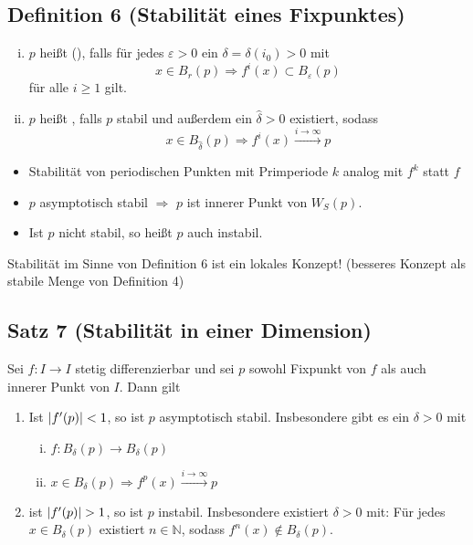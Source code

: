 \subsection{Definition 6 (Stabilität eines Fixpunktes)} %
\label{sub:definition_6}
\begin{enumerate}[(i)]
	\item $p$ heißt (), falls für jedes $\varepsilon>0$ ein $\delta=\delta(i_0)>0$ mit 
	\[
		x \in B_r(p) \Rightarrow f^i(x) \subset B_\varepsilon(p)
	\]
	für alle $i\ge 1$ gilt.
	\item $p$ heißt , falls $p$ stabil und außerdem ein $\hat{\delta}>0$ existiert, sodass 
	\[
		x \in B_{\hat{\delta}}(p) \Rightarrow f^i(x) \xrightarrow{i \to \infty} p 
	\]
\end{enumerate}
\begin{itemize}
	\item Stabilität von periodischen Punkten mit  Primperiode $k$ analog mit $f^k$ statt  $f$
	\item $p$ asymptotisch stabil $\Rightarrow $ $p$ ist innerer Punkt von $W_S(p)$.
	\item Ist $p$ nicht stabil, so heißt $p$ auch instabil.
\end{itemize}
Stabilität im Sinne von Definition 6 ist ein lokales Konzept! (besseres Konzept als stabile Menge von Definition 4)

\subsection{Satz 7 (Stabilität in einer Dimension)} %
\label{sub:satz_7}
Sei $f \colon I \to I$ stetig differenzierbar und sei $p$ sowohl Fixpunkt von $f$ als auch innerer Punkt von $I$. Dann gilt
\begin{enumerate}[(1)]
	\item Ist $\abs*{f'(p)} < 1 $, so ist $p$ asymptotisch stabil. Insbesondere gibt es ein $\delta>0$ mit
	\begin{enumerate}[i)]
		\item $f \colon B_\delta(p) \to B_\delta(p)$
		\item $x \in B_\delta(p) \Rightarrow f^p(x) \xrightarrow{i \to \infty} p$
	\end{enumerate}
	\item ist $\abs*{f'(p)}>1$, so ist $p$ instabil. Insbesondere existiert $\delta>0$ mit: Für jedes $x \in B_\delta(p)$ existiert $n \in \mathds{N}$, sodass 
	$f^n(x) \not\in B_\delta(p)$.
\end{enumerate}






\cleardoubleoddemptypage
{}
\setcounter{page}{1}
\printindex
\listoffigures
\todototoc
{}
